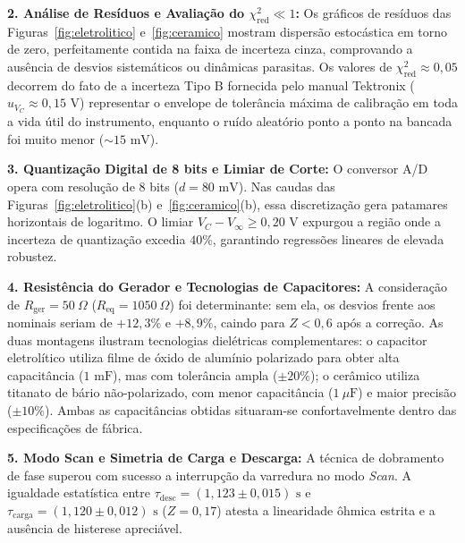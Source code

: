 \documentclass[12pt, a4paper]{article}
\begin{document}
\noindent\textbf{2. Análise de Resíduos e Avaliação do $\chi^2_{\text{red}} \ll 1$:}
Os gráficos de resíduos das Figuras~\ref{fig:eletrolitico} e~\ref{fig:ceramico} mostram dispersão estocástica em torno de zero, perfeitamente contida na faixa de incerteza cinza, comprovando a ausência de desvios sistemáticos ou dinâmicas parasitas. Os valores de $\chi^2_{\text{red}} \approx 0{,}05$ decorrem do fato de a incerteza Tipo B fornecida pelo manual Tektronix ($u_{V_C} \approx 0{,}15\text{ V}$) representar o envelope de tolerância máxima de calibração em toda a vida útil do instrumento, enquanto o ruído aleatório ponto a ponto na bancada foi muito menor ($\sim 15\text{ mV}$).

\noindent\textbf{3. Quantização Digital de 8 bits e Limiar de Corte:}
O conversor A/D opera com resolução de 8 bits ($d = 80\text{ mV}$). Nas caudas das Figuras~\ref{fig:eletrolitico}(b) e~\ref{fig:ceramico}(b), essa discretização gera patamares horizontais de logaritmo. O limiar $V_C - V_{\infty} \ge 0{,}20\text{ V}$ expurgou a região onde a incerteza de quantização excedia $40\%$, garantindo regressões lineares de elevada robustez.

\noindent\textbf{4. Resistência do Gerador e Tecnologias de Capacitores:}
A consideração de $R_{\text{ger}} = 50\ \Omega$ ($R_{\text{eq}} = 1050\ \Omega$) foi determinante: sem ela, os desvios frente aos nominais seriam de $+12{,}3\%$ e $+8{,}9\%$, caindo para $Z < 0{,}6$ após a correção. As duas montagens ilustram tecnologias dielétricas complementares: o capacitor eletrolítico utiliza filme de óxido de alumínio polarizado para obter alta capacitância ($1\text{ mF}$), mas com tolerância ampla ($\pm 20\%$); o cerâmico utiliza titanato de bário não-polarizado, com menor capacitância ($1\ \mu\text{F}$) e maior precisão ($\pm 10\%$). Ambas as capacitâncias obtidas situaram-se confortavelmente dentro das especificações de fábrica.

\noindent\textbf{5. Modo Scan e Simetria de Carga e Descarga:}
A técnica de dobramento de fase superou com sucesso a interrupção da varredura no modo \textit{Scan}. A igualdade estatística entre $\tau_{\text{desc}} = (1{,}123 \pm 0{,}015)\text{ s}$ e $\tau_{\text{carga}} = (1{,}120 \pm 0{,}012)\text{ s}$ ($Z = 0{,}17$) atesta a linearidade ôhmica estrita e a ausência de histerese apreciável.

\vspace{-0.25cm}
\end{document}
